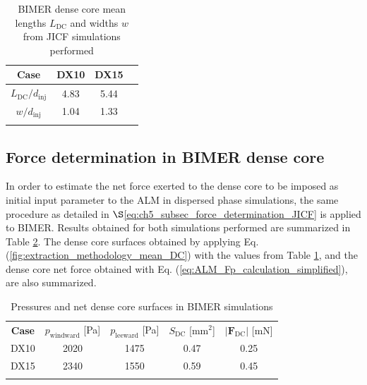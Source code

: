 
\begin{table}[!h]
\centering
\caption{BIMER dense core mean lengths $L_\mathrm{DC}$ and widths $w$ from JICF simulations performed}
\begin{tabular}{cccc}
\thickhline
\textbf{Case} &   DX10 & DX15  \\
\hline
$L_\mathrm{DC}/d_\mathrm{inj}$ & 4.83 & 5.44  \\
$w/d_\mathrm{inj}$ & 1.04 & 1.33  \\
\thickhline
\end{tabular}
\label{tab:BIMER_L_DC_values}
\end{table}


\subsection{Force determination in BIMER dense core}



In order to estimate the net force exerted to the dense core to be imposed as initial input parameter to the ALM in dispersed phase simulations, the same procedure as detailed in $\S$\ref{eq:ch5_subsec_force_determination_JICF} is applied to BIMER. Results obtained for both simulations performed are summarized in Table \ref{tab:BIMER_dense_core_pressures_and_force_parameters}. The dense core surfaces obtained by applying Eq. (\ref{fig:extraction_methodology_mean_DC}) with the values from Table \ref{tab:BIMER_L_DC_values}, and the dense core net force obtained with Eq. (\ref{eq:ALM_Fp_calculation_simplified}), are also summarized.


\begin{table}[!h]
\centering
\caption{Pressures and net dense core surfaces in BIMER simulations}
\begin{tabular}{ccccc}
\thickhline
\textbf{Case} & $p_\mathrm{windward}$ [Pa] & $p_\mathrm{leeward}$ [Pa] & $S_\mathrm{DC}$ [mm$^2$]& $|\boldsymbol{F}_\mathrm{DC}|$ [mN] \\
\thickhline 
DX10 & 2020 & 1475 & 0.47 & 0.25 \\
DX15 & 2340 & 1550 & 0.59 & 0.45 \\
\thickhline
\end{tabular}
\label{tab:BIMER_dense_core_pressures_and_force_parameters}
\end{table}

